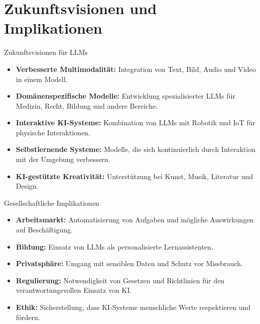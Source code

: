 \documentclass[aspectratio=1610, xcolor=dvipsnames, 9pt]{beamer}
\begin{document}
\section{Zukunftsvisionen und Implikationen}

\begin{frame}{Zukunftsvisionen für LLMs}
  \begin{itemize}
    \item \textbf{Verbesserte Multimodalität:} Integration von Text, Bild, Audio und Video in einem Modell. \\
    \item \textbf{Domänenspezifische Modelle:} Entwicklung spezialisierter LLMs für Medizin, Recht, Bildung und andere Bereiche. \\
    \item \textbf{Interaktive KI-Systeme:} Kombination von LLMs mit Robotik und IoT für physische Interaktionen.\\
    \item \textbf{Selbstlernende Systeme:} Modelle, die sich kontinuierlich durch Interaktion mit der Umgebung verbessern.\\
    \item \textbf{KI-gestützte Kreativität:} Unterstützung bei Kunst, Musik, Literatur und Design.
  \end{itemize}
\end{frame}

\begin{frame}{Gesellschaftliche Implikationen}
  \begin{itemize}
    \item \textbf{Arbeitsmarkt:} Automatisierung von Aufgaben und mögliche Auswirkungen auf Beschäftigung. \\
    \item \textbf{Bildung:} Einsatz von LLMs als personalisierte Lernassistenten. \\
    \item \textbf{Privatsphäre:} Umgang mit sensiblen Daten und Schutz vor Missbrauch. \\
    \item \textbf{Regulierung:} Notwendigkeit von Gesetzen und Richtlinien für den verantwortungsvollen Einsatz von KI. \\
    \item \textbf{Ethik:} Sicherstellung, dass KI-Systeme menschliche Werte respektieren und fördern.
  \end{itemize}
\end{frame}
\end{document}
